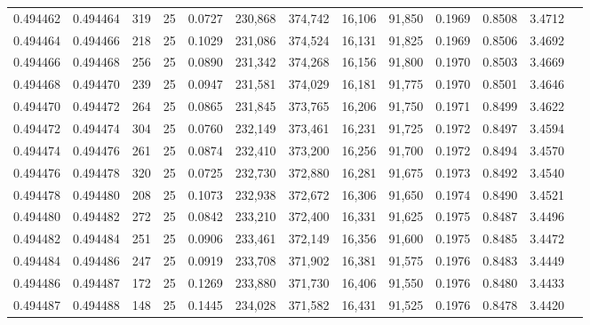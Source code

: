 \begin{tabular}{rrrrrrrrrrrrr}
0.494462 & 0.494464 &   319 &  25 &                                     0.0727 & 230,868 & 374,742 &  16,106 &  91,850 & 0.1969 & 0.8508 & 3.4712 \\
0.494464 & 0.494466 &   218 &  25 &                                     0.1029 & 231,086 & 374,524 &  16,131 &  91,825 & 0.1969 & 0.8506 & 3.4692 \\
0.494466 & 0.494468 &   256 &  25 &                                     0.0890 & 231,342 & 374,268 &  16,156 &  91,800 & 0.1970 & 0.8503 & 3.4669 \\
0.494468 & 0.494470 &   239 &  25 &                                     0.0947 & 231,581 & 374,029 &  16,181 &  91,775 & 0.1970 & 0.8501 & 3.4646 \\
0.494470 & 0.494472 &   264 &  25 &                                     0.0865 & 231,845 & 373,765 &  16,206 &  91,750 & 0.1971 & 0.8499 & 3.4622 \\
0.494472 & 0.494474 &   304 &  25 &                                     0.0760 & 232,149 & 373,461 &  16,231 &  91,725 & 0.1972 & 0.8497 & 3.4594 \\
0.494474 & 0.494476 &   261 &  25 &                                     0.0874 & 232,410 & 373,200 &  16,256 &  91,700 & 0.1972 & 0.8494 & 3.4570 \\
0.494476 & 0.494478 &   320 &  25 &                                     0.0725 & 232,730 & 372,880 &  16,281 &  91,675 & 0.1973 & 0.8492 & 3.4540 \\
0.494478 & 0.494480 &   208 &  25 &                                     0.1073 & 232,938 & 372,672 &  16,306 &  91,650 & 0.1974 & 0.8490 & 3.4521 \\
0.494480 & 0.494482 &   272 &  25 &                                     0.0842 & 233,210 & 372,400 &  16,331 &  91,625 & 0.1975 & 0.8487 & 3.4496 \\
0.494482 & 0.494484 &   251 &  25 &                                     0.0906 & 233,461 & 372,149 &  16,356 &  91,600 & 0.1975 & 0.8485 & 3.4472 \\
0.494484 & 0.494486 &   247 &  25 &                                     0.0919 & 233,708 & 371,902 &  16,381 &  91,575 & 0.1976 & 0.8483 & 3.4449 \\
0.494486 & 0.494487 &   172 &  25 &                                     0.1269 & 233,880 & 371,730 &  16,406 &  91,550 & 0.1976 & 0.8480 & 3.4433 \\
0.494487 & 0.494488 &   148 &  25 &                                     0.1445 & 234,028 & 371,582 &  16,431 &  91,525 & 0.1976 & 0.8478 & 3.4420 \\

\end{tabular}
